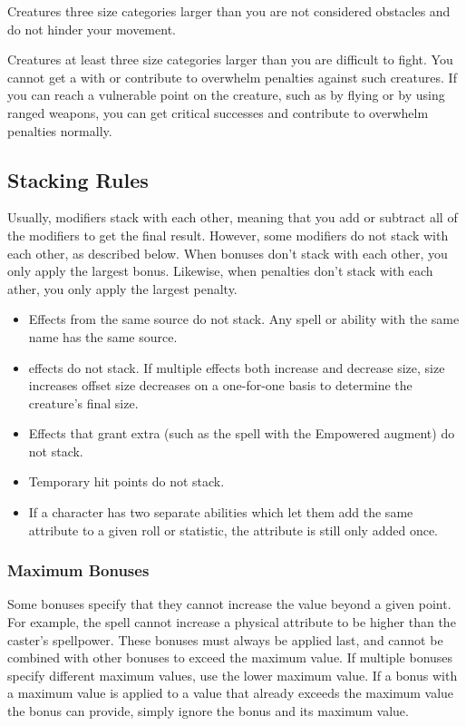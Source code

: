              Creatures three size categories larger than you are not considered obstacles and do not hinder your movement.

             Creatures at least three size categories larger than you are difficult to fight. You cannot get a  with  or contribute to overwhelm penalties against such creatures. If you can reach a vulnerable point on the creature, such as by flying or by using ranged weapons, you can get critical successes and contribute to overwhelm penalties normally.

    \subsection{Stacking Rules}\label{Stacking Rules}
        Usually, modifiers stack with each other, meaning that you add or subtract all of the modifiers to get the final result. However, some modifiers do not stack with each other, as described below. When bonuses don't stack with each other, you only apply the largest bonus. Likewise, when penalties don't stack with each ather, you only apply the largest penalty.


        \begin{itemize}
            \item Effects from the same source do not stack. Any spell or ability with the same name has the same source.
            \item {} effects do not stack.
                If multiple effects both increase and decrease size, size increases offset size decreases on a one-for-one basis to determine the creature's final size.
            \item Effects that grant extra  (such as the  spell with the Empowered augment) do not stack.
            \item Temporary hit points do not stack.
            \item If a character has two separate abilities which let them add the same attribute to a given roll or statistic, the attribute is still only added once.
        \end{itemize}

        \subsubsection{Maximum Bonuses}\label{Ability Limits}
            Some bonuses specify that they cannot increase the value beyond a given point.
            For example, the  spell cannot increase a physical attribute to be higher than the caster's spellpower.
            These bonuses must always be applied last, and cannot be combined with other bonuses to exceed the maximum value.
            If multiple bonuses specify different maximum values, use the lower maximum value.
            If a bonus with a maximum value is applied to a value that already exceeds the maximum value the bonus can provide, simply ignore the bonus and its maximum value.

